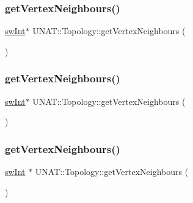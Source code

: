\mbox{\label{classUNAT_1_1Topology_af12c10ecd41c8458daf3d8d621f8e42f}} 
\subsubsection{\texorpdfstring{getVertexNeighbours()}{getVertexNeighbours()}\hspace{0.1cm}{\footnotesize\ttfamily [1/3]}}
{\footnotesize\ttfamily \mbox{\hyperlink{include_2swMacro_8h_a113cf5f6b5377cdf3fac6aa4e443e9aa}{sw\+Int}}$\ast$ U\+N\+A\+T\+::\+Topology\+::get\+Vertex\+Neighbours (\begin{DoxyParamCaption}{ }\end{DoxyParamCaption})}

\mbox{\label{classUNAT_1_1Topology_af12c10ecd41c8458daf3d8d621f8e42f}} 
\subsubsection{\texorpdfstring{getVertexNeighbours()}{getVertexNeighbours()}\hspace{0.1cm}{\footnotesize\ttfamily [2/3]}}
{\footnotesize\ttfamily \mbox{\hyperlink{include_2swMacro_8h_a113cf5f6b5377cdf3fac6aa4e443e9aa}{sw\+Int}}$\ast$ U\+N\+A\+T\+::\+Topology\+::get\+Vertex\+Neighbours (\begin{DoxyParamCaption}{ }\end{DoxyParamCaption})}

\mbox{\label{classUNAT_1_1Topology_ae41f724783379d204fa64cba52b22395}} 
\subsubsection{\texorpdfstring{getVertexNeighbours()}{getVertexNeighbours()}\hspace{0.1cm}{\footnotesize\ttfamily [3/3]}}
{\footnotesize\ttfamily \mbox{\hyperlink{include_2swMacro_8h_a113cf5f6b5377cdf3fac6aa4e443e9aa}{sw\+Int}} $\ast$ U\+N\+A\+T\+::\+Topology\+::get\+Vertex\+Neighbours (\begin{DoxyParamCaption}{ }\end{DoxyParamCaption})}

